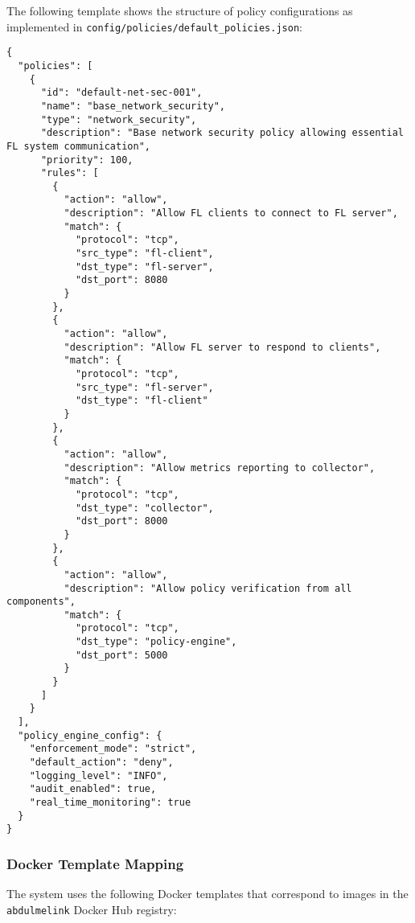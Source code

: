 The following template shows the structure of policy configurations as implemented in \texttt{config/policies/default\_policies.json}:

\begin{lstlisting}[style=jsoncode, caption=Policy Configuration Template]
{
  "policies": [
    {
      "id": "default-net-sec-001",
      "name": "base_network_security",
      "type": "network_security",
      "description": "Base network security policy allowing essential FL system communication",
      "priority": 100,
      "rules": [
        {
          "action": "allow",
          "description": "Allow FL clients to connect to FL server",
          "match": {
            "protocol": "tcp",
            "src_type": "fl-client",
            "dst_type": "fl-server",
            "dst_port": 8080
          }
        },
        {
          "action": "allow",
          "description": "Allow FL server to respond to clients",
          "match": {
            "protocol": "tcp",
            "src_type": "fl-server",
            "dst_type": "fl-client"
          }
        },
        {
          "action": "allow",
          "description": "Allow metrics reporting to collector",
          "match": {
            "protocol": "tcp",
            "dst_type": "collector",
            "dst_port": 8000
          }
        },
        {
          "action": "allow",
          "description": "Allow policy verification from all components",
          "match": {
            "protocol": "tcp",
            "dst_type": "policy-engine",
            "dst_port": 5000
          }
        }
      ]
    }
  ],
  "policy_engine_config": {
    "enforcement_mode": "strict",
    "default_action": "deny",
    "logging_level": "INFO",
    "audit_enabled": true,
    "real_time_monitoring": true
  }
}
\end{lstlisting}

\subsubsection{Docker Template Mapping}

The system uses the following Docker templates that correspond to images in the \texttt{abdulmelink} Docker Hub registry:

